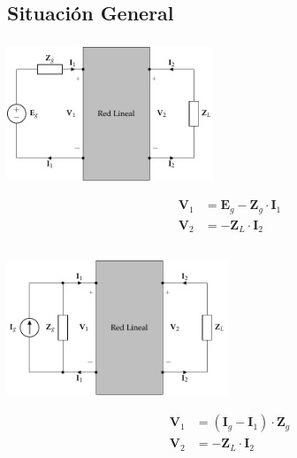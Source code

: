 \subsection{Situación General}
\label{sec:orgf52f6e2}
\subsubsection{}
\label{sec:org495ece7}
\begin{center}
\includegraphics[height=4cm]{../figs/cuadripolo_cargado_fuente_tension.pdf}
\end{center}

\begin{align*}
  \mathbf{V}_1 &= \mathbf{E}_g - \mathbf{Z}_g \cdot \mathbf{I}_1\\
  \mathbf{V}_2 &= - \mathbf{Z}_L \cdot \mathbf{I}_2\\
\end{align*}

\subsubsection{}
\label{sec:orgc9420fa}
\begin{center}
\includegraphics[height=4cm]{../figs/cuadripolo_cargado_fuente_corriente.pdf}
\end{center}

\begin{align*}
  \mathbf{V}_1 &= (\mathbf{I}_g - \mathbf{I}_1) \cdot \mathbf{Z}_g\\
  \mathbf{V}_2 &= - \mathbf{Z}_L \cdot \mathbf{I}_2\\
\end{align*}


